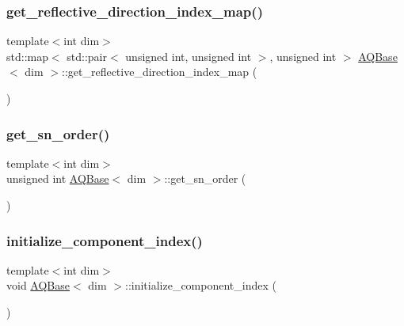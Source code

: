 \mbox{\label{class_a_q_base_a1cb901657861f7fc580fc29e10c0b691}} 
\subsubsection{\texorpdfstring{get\+\_\+reflective\+\_\+direction\+\_\+index\+\_\+map()}{get\_reflective\_direction\_index\_map()}}
{\footnotesize\ttfamily template$<$int dim$>$ \\
std\+::map$<$ std\+::pair$<$ unsigned int, unsigned int $>$, unsigned int $>$ \hyperlink{class_a_q_base}{A\+Q\+Base}$<$ dim $>$\+::get\+\_\+reflective\+\_\+direction\+\_\+index\+\_\+map (\begin{DoxyParamCaption}{ }\end{DoxyParamCaption})}

\mbox{\label{class_a_q_base_a9ce78884d13c584a8f415c16976ea6f0}} 
\subsubsection{\texorpdfstring{get\+\_\+sn\+\_\+order()}{get\_sn\_order()}}
{\footnotesize\ttfamily template$<$int dim$>$ \\
unsigned int \hyperlink{class_a_q_base}{A\+Q\+Base}$<$ dim $>$\+::get\+\_\+sn\+\_\+order (\begin{DoxyParamCaption}{ }\end{DoxyParamCaption})}

\mbox{\label{class_a_q_base_ab1cbcd2132328df15fb9651597e8ab48}} 
\subsubsection{\texorpdfstring{initialize\+\_\+component\+\_\+index()}{initialize\_component\_index()}}
{\footnotesize\ttfamily template$<$int dim$>$ \\
void \hyperlink{class_a_q_base}{A\+Q\+Base}$<$ dim $>$\+::initialize\+\_\+component\+\_\+index (\begin{DoxyParamCaption}{ }\end{DoxyParamCaption})\hspace{0.3cm}{\ttfamily [virtual]}}

